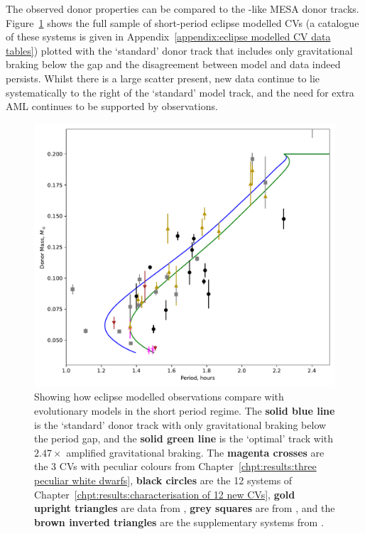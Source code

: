 The observed donor properties can be compared to the \citet{knigge11}-like MESA donor tracks. Figure~\ref{fig:12 new cvs:donor model with eclipsers plotted} shows the full sample of short-period eclipse modelled CVs (a catalogue of these systems is given in Appendix~\ref{appendix:eclipse modelled CV data tables}) plotted with the `standard' donor track that includes only gravitational braking below the gap and the disagreement between model and data indeed persists. Whilst there is a large scatter present, new data continue to lie systematically to the right of the `standard' model track, and the need for extra AML continues to be supported by observations.
\begin{figure}
    \centering
    \includegraphics[width=\textwidth]{figures/results/K11_donor_track_with_eclipse_modelled_data.pdf}
    \caption{Showing how eclipse modelled observations compare with evolutionary models in the short period regime. The {\bf solid blue line} is the `standard' \citet{knigge11} donor track with only gravitational braking below the period gap, and the {\bf solid green line} is the `optimal' track with $2.47\times$ amplified gravitational braking. The {\bf magenta crosses} are the 3 CVs with peculiar colours from Chapter~\ref{chpt:results:three peculiar white dwarfs}, {\bf black circles} are the 12 systems of Chapter~\ref{chpt:results:characterisation of 12 new CVs}, {\bf gold upright triangles} are data from \citet{McAllister2019}, {\bf grey squares} are from \citet{Savoury2011}, and the {\bf brown inverted triangles} are the supplementary systems from \citet{copperwheat2010,mcallister2015,mcallister2017,mcallister2017b}.}
    \label{fig:12 new cvs:donor model with eclipsers plotted}
\end{figure}



